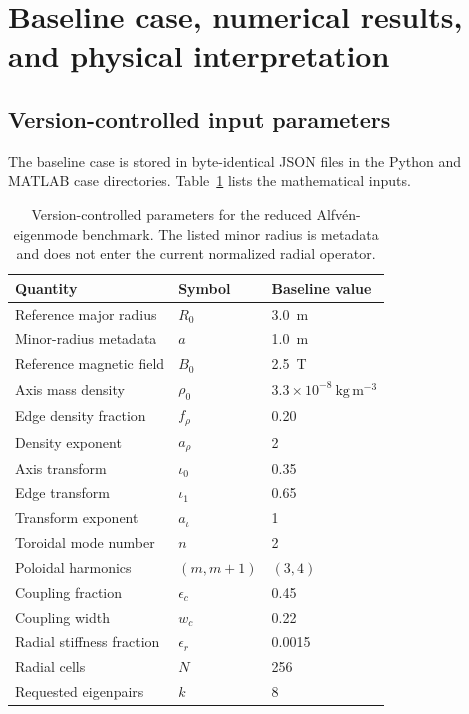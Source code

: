 \section{Baseline case, numerical results, and physical interpretation}
\label{sec:baseline_results}

\subsection{Version-controlled input parameters}
The baseline case is stored in byte-identical JSON files in the Python and MATLAB case directories. Table~\ref{tab:baseline_parameters_textbook} lists the mathematical inputs.

\begin{table}[htbp]
\centering
\begin{tabular}{lll}
\toprule
Quantity & Symbol & Baseline value\\
\midrule
Reference major radius & $R_0$ & \SI{3.0}{m}\\
Minor-radius metadata & $a$ & \SI{1.0}{m}\\
Reference magnetic field & $B_0$ & \SI{2.5}{T}\\
Axis mass density & $\rho_0$ & $3.3\times10^{-8}\ \mathrm{kg\,m^{-3}}$\\
Edge density fraction & $f_\rho$ & 0.20\\
Density exponent & $a_\rho$ & 2\\
Axis transform & $\iota_0$ & 0.35\\
Edge transform & $\iota_1$ & 0.65\\
Transform exponent & $a_\iota$ & 1\\
Toroidal mode number & $n$ & 2\\
Poloidal harmonics & $(m,m+1)$ & $(3,4)$\\
Coupling fraction & $\epsilon_c$ & 0.45\\
Coupling width & $w_c$ & 0.22\\
Radial stiffness fraction & $\epsilon_r$ & 0.0015\\
Radial cells & $N$ & 256\\
Requested eigenpairs & $k$ & 8\\
\bottomrule
\end{tabular}
\caption{Version-controlled parameters for the reduced Alfv\'en-eigenmode benchmark. The listed minor radius is metadata and does not enter the current normalized radial operator.}
\label{tab:baseline_parameters_textbook}
\end{table}

